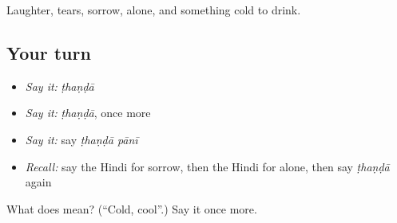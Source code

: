 \begin{grammarlens}[title={What you've built}]
Laughter, tears, sorrow, alone, and something cold to drink.
\end{grammarlens}

\subsection*{Your turn}
\begin{itemize}
\raggedright
  \item \emph{Say it:} \emph{ṭhaṇḍā}
  \item \emph{Say it:} \emph{ṭhaṇḍā}, once more
  \item \emph{Say it:} say \emph{ṭhaṇḍā pānī}
  \item \emph{Recall:} say the Hindi for sorrow, then the Hindi for alone, then say \emph{ṭhaṇḍā} again
\end{itemize}

\begin{tcolorbox}[breakable,colback=teal!4,colframe=teal!35!black,title={Before you move on}]
What does  mean? (\textquotedblleft{}Cold, cool\textquotedblright{}.) Say it once more.
\end{tcolorbox}

